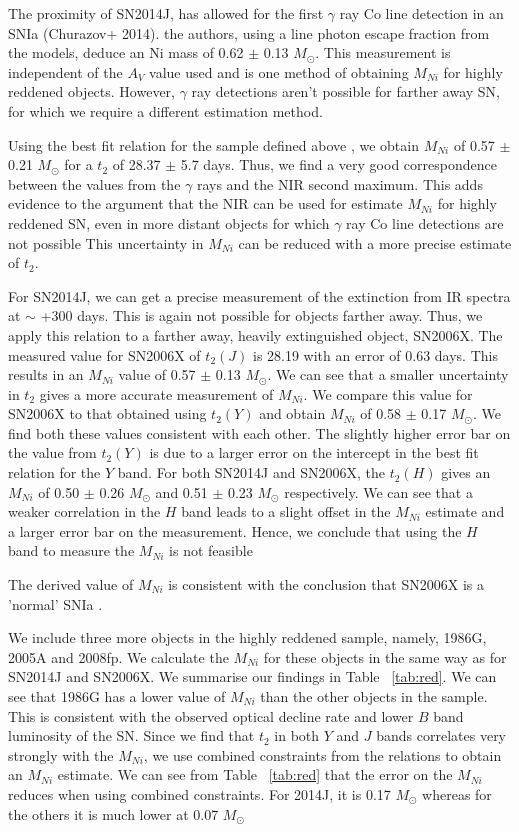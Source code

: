The proximity of SN2014J, has allowed for the first $\gamma$ ray Co line detection in an SNIa (Churazov+ 2014). the authors, using a line photon escape fraction from the models, 
deduce an Ni mass of 0.62  $\pm$ 0.13 $M_{\odot}$. This measurement is
 independent of the $A_V$ value used and is one method of obtaining $M_{Ni}$ for highly reddened objects. However, $\gamma$ ray detections aren't possible for farther away SN, for which we require a different estimation method. 

Using the best fit relation for the sample defined above , we obtain $M_{Ni}$ of 0.57 $\pm$ 0.21 $M_{\odot}$  for a $t_2$ of 28.37 $\pm$ 5.7 days. 
Thus, we find a very good correspondence between the values from the $\gamma$ rays and the NIR second maximum. This adds evidence to the argument that the NIR can be used for estimate $M_{Ni}$ for highly reddened SN,
even in more distant objects for which $\gamma$ ray Co line detections are not possible
This uncertainty in $M_{Ni}$ can be reduced with a more precise estimate of $t_2$. 

For SN2014J, we can get a precise measurement of the extinction from IR spectra at $\sim$ +300 days. This is again not possible for 
objects farther away. Thus, we apply this relation to a farther away, heavily extinguished object, SN2006X. 
The measured value for SN2006X of $t_2(J)$ is 28.19 with an error of 0.63  days. This results in an $M_{Ni}$ value of 0.57 $\pm$ 0.13 $M_{\odot}$. We can see that a smaller uncertainty in $t_2$ gives a more accurate measurement of 
$M_{Ni}$. We compare this value for SN2006X to that obtained using $t_2(Y)$ and obtain $M_{Ni}$ of 0.58 $\pm$ 0.17 $M_{\odot}$. We find both these values consistent with each other. The slightly higher error bar on
 the value from $t_2(Y)$ is due to a larger error on the 
intercept in the best fit relation for the $Y$ band. 
For both SN2014J and SN2006X, the $t_2(H)$ gives an $M_{Ni}$ of 0.50 $\pm$ 0.26 $M_{\odot}$ and 0.51 $\pm$ 0.23 $M_{\odot}$ respectively. We can see that a weaker correlation in the $H$ band leads to a slight offset in the $M_{Ni}$ estimate and 
a larger error bar on the measurement. Hence, we conclude that using the $H$ band to measure the $M_{Ni}$ is not feasible

The derived value of $M_{Ni}$ is consistent with the conclusion that SN2006X is a 'normal' SNIa \citep{Wang2007,Patat2007}. 



We include three more objects in the highly reddened sample, namely, 1986G, 2005A and 2008fp. We calculate the $M_{Ni}$ for these objects in the same way as for SN2014J and SN2006X. We summarise our findings in Table ~\ref{tab:red}.
We can see that 1986G has a lower value of $M_{Ni}$ than the other objects in the sample. This is consistent with the observed optical decline rate and lower $B$ band luminosity of the SN. Since we find that $t_2$ in both $Y$ and $J$ bands correlates very strongly with the $M_{Ni}$, we use combined constraints from the relations to obtain an $M_{Ni}$ estimate. We can see from Table ~\ref{tab:red} that the error on the $M_{Ni}$ reduces when using combined constraints. For 2014J, it is 0.17 $M_{\odot}$ whereas for the others it is much lower at 0.07 $M_{\odot}$ 


